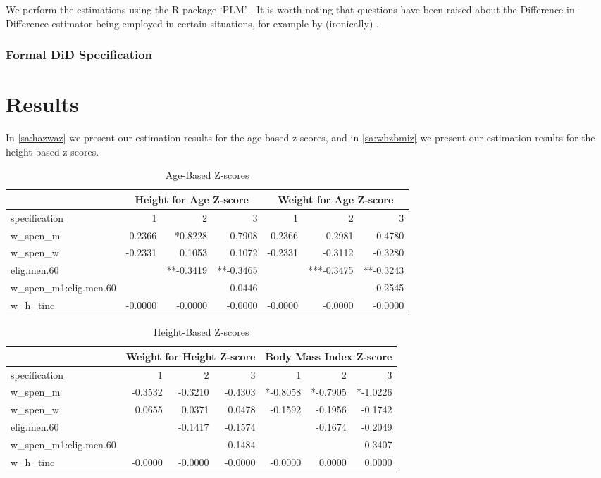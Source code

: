 \begin{refsection}
We perform the estimations using the R package `PLM' \parencite[see][]{croissant2008panel}.
It is worth noting  that questions have been raised about the Difference-in-Difference estimator being employed in certain situations,
for example by (ironically) \textcite{bertrand2004much}.

\subsubsection{Formal DiD Specification}


\section{Results}
In \autoref{sa:hazwaz} we present our estimation results for the age-based z-scores,
and in \autoref{sa:whzbmiz} we present our estimation results for the height-based z-scores.

\begin{table}[!ht]
\centering
\caption{Age-Based Z-scores}
\label{sa:hazwaz}
\begin{tabular}{l|rrr|rrr}
& \multicolumn{3}{c}{Height for Age Z-score} & \multicolumn{3}{c}{Weight for Age Z-score}\\
\hline
specification & 1 & 2 & 3 & 1 & 2 & 3\\
\hline
w\_spen\_m & 0.2366 & *0.8228 & 0.7908 & 0.2366 & 0.2981 & 0.4780 \\
w\_spen\_w & -0.2331 & 0.1053 & 0.1072 & -0.2331 & -0.3112 & -0.3280 \\
elig.men.60 & & **-0.3419 & **-0.3465 & & ***-0.3475 & **-0.3243 \\
w\_spen\_m1:elig.men.60 & & & 0.0446 & & & -0.2545 \\
w\_h\_tinc & -0.0000 & -0.0000 & -0.0000 & -0.0000 & -0.0000 & -0.0000 \\
\end{tabular}
\end{table}

\begin{table}[!ht]
\centering
\caption{Height-Based Z-scores}
\label{sa:whzbmiz}
\begin{tabular}{l|rrr|rrr}
& \multicolumn{3}{c}{Weight for Height Z-score} & \multicolumn{3}{c}{Body Mass Index Z-score}\\
\hline
specification & 1 & 2 & 3 & 1 & 2 & 3 \\
\hline
w\_spen\_m &  -0.3532 & -0.3210 & -0.4303 & *-0.8058 & *-0.7905 & *-1.0226 \\
w\_spen\_w & 0.0655 & 0.0371 & 0.0478 & -0.1592 & -0.1956 & -0.1742 \\
elig.men.60 & & -0.1417 & -0.1574 & & -0.1674 & -0.2049 \\
w\_spen\_m1:elig.men.60 & & & 0.1484 & & & 0.3407 \\
w\_h\_tinc & -0.0000 & -0.0000 & -0.0000 & -0.0000 & 0.0000 & 0.0000
\end{tabular}
\end{table}




\end{refsection}
